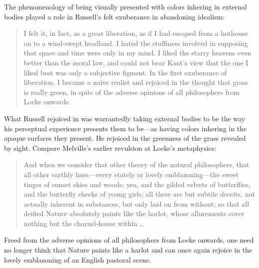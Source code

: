 \documentclass[12pt]{article}
\begin{document}

The phenomenology of being visually presented with colors inhering in external bodies played a role in Russell's felt exuberance in abandoning idealism:
\begin{quote}
	I felt it, in fact, as a great liberation, as if I had escaped from a hothouse on to a wind-swept headland. I hated the stuffiness involved in supposing that space and time were only in my mind. I liked the starry heavens even better than the moral law, and could not bear Kant’s view that the one I liked best was only a subjective figment. In the first exuberance of liberation, I became a naïve realist and rejoiced in the thought that grass is really green, in spite of the adverse opinions of all philosophers from Locke onwards. \citep[48]{Russell:1959fv}
\end{quote}
What Russell rejoiced in was warrantedly taking external bodies to be the way his perceptual experience presents them to be---as having colors inhering in the opaque surfaces they present. He rejoiced in the greenness of the grass revealed by sight. Compare Melville's earlier revulsion at Locke's metaphysics:
\begin{quote}
	And when we consider that other theory of the natural philosophers, that all other earthly hues---every stately or lovely emblazoning---the sweet tinges of sunset skies and woods; yea, and the gilded velvets of butterflies, and the butterfly cheeks of young girls; all these are but subtile deceits, not actually inherent in substances, but only laid on from without; so that all deified Nature absolutely paints like the harlot, whose allurements cover nothing but the charnel-house within \ldots\ \citep[ch. 42]{Melville:1851ms}
\end{quote}
Freed from the adverse opinions of all philosophers from Locke onwards, one need no longer think that Nature paints like a harlot and can once again rejoice in the lovely emblazoning of an English pastoral scene.
\end{document}
